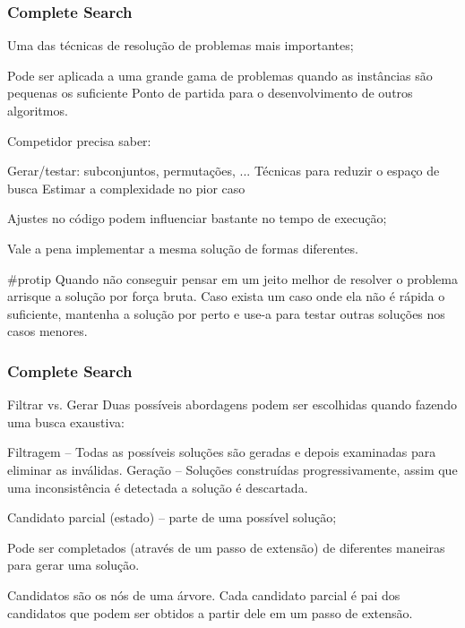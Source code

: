 \begin{frame}
\frametitle{Complete Search}

\begin{block}{}
\begin{itemize}
	\bitem Uma das técnicas de resolução de problemas mais importantes;
	\begin{itemize}
		\bitem Pode ser aplicada a uma grande gama de problemas quando as instâncias são pequenas os suficiente
		\bitem Ponto de partida para o desenvolvimento de outros algoritmos.
	\end{itemize}
	\bitem Competidor precisa saber:
	\begin{itemize}
		\bitem Gerar/testar: subconjuntos, permutações, ...
		\bitem Técnicas para reduzir o espaço de busca
		\bitem Estimar a complexidade no pior caso
	\end{itemize}
	\bitem Ajustes no código podem influenciar bastante no tempo de execução;
	\begin{itemize}
		\bitem Vale a pena implementar a mesma solução de formas diferentes.
	\end{itemize}
\end{itemize}	
\end{block}

\begin{block}{\tiny \#protip}
Quando não conseguir pensar em um jeito melhor de resolver o problema arrisque a solução por força bruta.
Caso exista um caso onde ela não é rápida o suficiente, mantenha a solução por perto e use-a para testar outras soluções nos casos menores.
\end{block}
\end{frame}

\begin{frame}
\frametitle{Complete Search}
\begin{block}{Filtrar vs. Gerar }
Duas possíveis abordagens podem ser escolhidas quando fazendo uma busca exaustiva:
\begin{itemize}
	\bitem Filtragem -- Todas as possíveis soluções são geradas e depois examinadas para eliminar as inválidas.
	\bitem Geração -- Soluções construídas progressivamente, assim que uma inconsistência é detectada a solução é descartada.
\end{itemize}
\end{block}
\pause
\begin{block}{}
\begin{itemize}
	\bitem Candidato parcial (estado) -- parte de uma possível solução;
	\begin{itemize}
		\bitem Pode ser completados (através de um passo de extensão) de diferentes maneiras para gerar uma solução.
	\end{itemize}	
	\bitem Candidatos são os nós de uma árvore. Cada candidato parcial é pai dos candidatos que podem ser obtidos a partir dele em um passo de extensão.
\end{itemize}
\end{block}
\end{frame}

